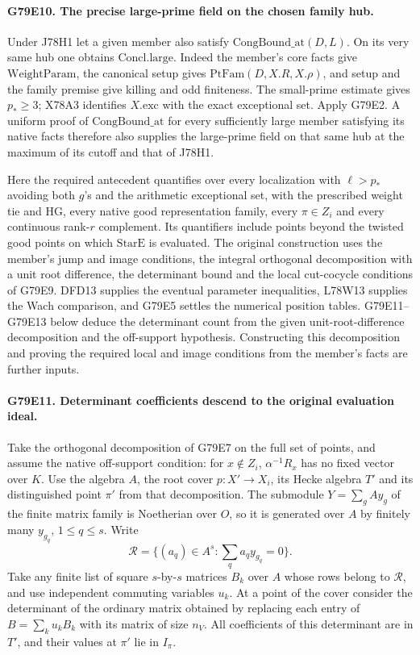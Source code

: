 \paragraph{G79E10. The precise large-prime field on the chosen family hub.}
Under J78H1 let a given member also satisfy
$\mathrm{CongBound\_at}(D,L)$. On its very same hub one obtains
$\mathrm{Concl.large}$. Indeed the member's core facts give
$\mathrm{WeightParam}$, the canonical setup gives
$\mathrm{PtFam}(D,X.R,X.\rho)$, and setup and the family premise
give killing and odd finiteness. The small-prime estimate gives
$p_*\ge3$; X78A3 identifies $X.\mathrm{exc}$ with the exact
exceptional set. Apply G79E2. A uniform proof of
$\mathrm{CongBound\_at}$ for every sufficiently large member
satisfying its native facts therefore also supplies the large-prime
field on that same hub at the maximum of its cutoff and that of J78H1.

Here the required antecedent quantifies over every localization with
$\ell>p_*$ avoiding both $g$'s and the arithmetic exceptional set,
with the prescribed weight tie and $\mathrm{HG}$, every native
good representation family, every $\pi\in Z_i$ and every continuous
rank-$r$ complement. Its quantifiers include points beyond the
twisted good points on which $\mathrm{StarE}$ is evaluated.
The original construction uses the member's jump and image
conditions, the integral orthogonal decomposition with a unit
root difference, the determinant bound and the local cut-cocycle
conditions of G79E9. DFD13 supplies the eventual parameter
inequalities, L78W13 supplies the Wach comparison, and G79E5
settles the numerical position tables. G79E11--G79E13 below deduce the determinant count from the given
unit-root-difference decomposition and the off-support hypothesis.
Constructing this decomposition and proving the required local and
image conditions from the member's facts are further inputs.

\paragraph{G79E11. Determinant coefficients descend to the original evaluation ideal.}
Take the orthogonal decomposition of G79E7 on the full set of points,
and assume the native off-support condition: for $x\notin Z_i$,
$\alpha^{-1}R_x$ has no fixed vector over $K$. Use the algebra $A$,
the root cover $p:X'\to X_i$, its Hecke algebra $T'$ and its
distinguished point $\pi'$ from that decomposition. The submodule
$Y=\sum_g A y_g$ of the finite matrix family is Noetherian over $O$,
so it is generated over $A$ by finitely many $y_{g_q}$, $1\le q\le s$.
Write
\[
 \mathcal R=\{(a_q)\in A^s:\textstyle\sum_q a_q y_{g_q}=0\}.
\]
Take any finite list of square $s$-by-$s$ matrices $B_k$ over $A$
whose rows belong to $\mathcal R$, and use independent commuting
variables $u_k$. At a point of the cover consider the determinant
of the ordinary matrix obtained by replacing each entry of
$B=\sum_k u_k B_k$ with its matrix of size $n_V$. All coefficients
of this determinant are in $T'$, and their values at $\pi'$ lie
in $I_\pi$.

